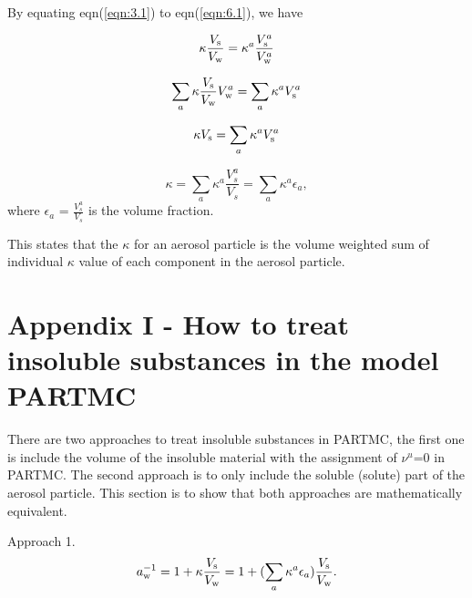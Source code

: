 \documentclass[12pt]{article}
\begin{document}

By equating eqn(\ref{eqn:3.1}) to eqn(\ref{eqn:6.1}), we have

\begin{equation}\label{eqn:6.14}
\kappa \frac{V_{\rm s}}{V_{\rm w}}= \kappa^{a} \frac{V_{\rm s}^{a}}{V_{\rm w}^{a}}
\end{equation}

\begin{equation}\label{eqn:6.15}
\sum_{a} \kappa \frac{V_{\rm s}}{V_{\rm w}} V_{\rm w}^{a}= \sum_{a} \kappa^{a} V_{\rm s}^{a}
\end{equation}

\begin{equation}\label{eqn:6.16}
\kappa V_{\rm s}= \sum_{a} \kappa^{a} V_{\rm s}^{a}
\end{equation}

\begin{equation}\label{eqn:6.17}
\kappa= \sum_{a} \kappa^{a} \frac {V_{s}^{a}}{V_{s}} = \sum_{a} \kappa^{a} \epsilon_{a},
\end{equation}
where $\epsilon_{a}$ = $ \frac{V_{s}^{a}}{V_{s}}$ is the volume fraction.

This states that the $\kappa$ for an aerosol particle is the volume weighted sum of individual $\kappa$ value of each component in the aerosol particle.  

\section{Appendix I - How to treat insoluble substances in the model PARTMC}

There are two approaches to treat insoluble substances in PARTMC, the first one is include the volume of the insoluble material with the assignment of $\nu^{u}$=$0$ in PARTMC. The second approach is to only include the soluble (solute) part of the aerosol particle. This section is to show that both approaches are mathematically equivalent.
 
Approach 1. 
\begin{equation}\label{eqn:A1}
a_{\rm w}^{-1}=1+\kappa \frac{V_{\rm s}}{V_{\rm w}}=1+ (\sum_{a} \kappa^{a} \epsilon_{a})\frac{V_{\rm s}}{V_{\rm w}}.
\end{equation}
\end{document}
